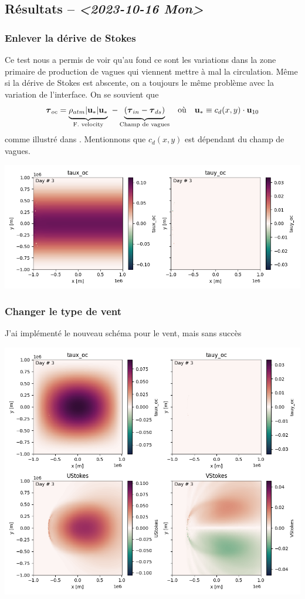 \documentclass[10pt]{report}
\numberwithin{equation}{section}
\newcommand{\uu}{\vb{u}}
\newcommand{\tall}{\vphantom{A^{x^x}_p}}
\begin{document}
\newpage

\subsection{Résultats -- \textit{<2023-10-16 Mon>}}
\label{sec:orgf6f000c}

\subsubsection{Enlever la dérive de Stokes}
\label{sec:org9800e1d}
Ce test nous a permis de voir qu'au fond ce sont les variations dans la zone primaire de production de vagues qui viennent mettre à mal la circulation.
Même si la dérive de Stokes est abscente, on a toujours le même problème avec la variation de l'interface.
On se souvient que
\begin{align}
   && \boldsymbol{\tau}_{oc} = \underbrace{\rho_{atm} |\uu_*|\uu_*\tall}_\text{F. velocity} \ - \underbrace{\qty(\boldsymbol{\tau}_{in} - \boldsymbol{\tau}_{ds})\tall}_\text{Champ de vagues} && \text{où} && \uu_* \equiv c_d(x,y)\cdot\uu_{10} &&
\end{align}
comme illustré dans \autocite{breivik_al_2015}.
Mentionnons que \(c_d(x,y)\) est dépendant du champ de vagues. 
\begin{center}
\includegraphics[width=.9\linewidth]{figures/debuggage/2023_10_16_nostokes_tauoc.png}
\end{center}

\subsubsection{Changer le type de vent}
\label{sec:org2d853cf}
J'ai implémenté le nouveau schéma pour le vent, mais sans succès

\begin{center}
\includegraphics[width=.9\linewidth]{figures/debuggage/2023_10_16_ramp_tauETUstokes.png}
\end{center}



\printbibliography
\end{document}
